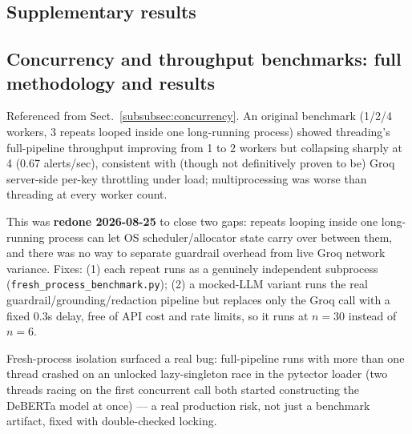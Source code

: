 \documentclass[pdflatex,sn-mathphys-num]{sn-jnl}%
\begin{document}
\begin{appendices}

\section{Supplementary results}\label{secA0}

\subsection{Concurrency and throughput benchmarks: full methodology and results}\label{secA0-concurrency}

Referenced from Sect.~\ref{subsubsec:concurrency}. An original benchmark
(1/2/4 workers, 3 repeats looped inside one long-running process) showed
threading's full-pipeline throughput improving from 1 to 2 workers but
collapsing sharply at 4 (0.67 alerts/sec), consistent with (though not
definitively proven to be) Groq server-side per-key throttling under
load; multiprocessing was worse than threading at every worker count.

This was \textbf{redone 2026-08-25} to close two gaps: repeats looping
inside one long-running process can let OS scheduler/allocator state
carry over between them, and there was no way to separate guardrail
overhead from live Groq network variance. Fixes: (1) each repeat runs as
a genuinely independent subprocess
(\texttt{fresh\_process\_benchmark.py}); (2) a mocked-LLM variant runs
the real guardrail/grounding/redaction pipeline but replaces only the
Groq call with a fixed 0.3s delay, free of API cost and rate limits, so
it runs at $n=30$ instead of $n=6$.

Fresh-process isolation surfaced a real bug: full-pipeline runs with
more than one thread crashed on an unlocked lazy-singleton race in the
pytector loader (two threads racing on the first concurrent call both
started constructing the DeBERTa model at once) --- a real production
risk, not just a benchmark artifact, fixed with double-checked locking.


\end{appendices}
\end{document}
